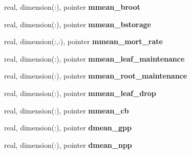 \begin{DoxyCompactItemize}
\item 
\hypertarget{structed__state__vars_1_1patchtype_a2a013a023ec71e2b554bc514fd9c9282}{
real, dimension(:), pointer {\bfseries mmean\_\-broot}}
\label{structed__state__vars_1_1patchtype_a2a013a023ec71e2b554bc514fd9c9282}

\item 
\hypertarget{structed__state__vars_1_1patchtype_a48dab77395ad823cafe89d0a52bda8e7}{
real, dimension(:), pointer {\bfseries mmean\_\-bstorage}}
\label{structed__state__vars_1_1patchtype_a48dab77395ad823cafe89d0a52bda8e7}

\item 
\hypertarget{structed__state__vars_1_1patchtype_a3a541c28f0a48ca5abe5ce2f834b38d2}{
real, dimension(:,:), pointer {\bfseries mmean\_\-mort\_\-rate}}
\label{structed__state__vars_1_1patchtype_a3a541c28f0a48ca5abe5ce2f834b38d2}

\item 
\hypertarget{structed__state__vars_1_1patchtype_aee9e218835a8e270ae3adbb804ff0c3a}{
real, dimension(:), pointer {\bfseries mmean\_\-leaf\_\-maintenance}}
\label{structed__state__vars_1_1patchtype_aee9e218835a8e270ae3adbb804ff0c3a}

\item 
\hypertarget{structed__state__vars_1_1patchtype_a7b9f536ab813fd34f2f90733b2f02f10}{
real, dimension(:), pointer {\bfseries mmean\_\-root\_\-maintenance}}
\label{structed__state__vars_1_1patchtype_a7b9f536ab813fd34f2f90733b2f02f10}

\item 
\hypertarget{structed__state__vars_1_1patchtype_aebd13813e9b9fe96817c90b298065ad0}{
real, dimension(:), pointer {\bfseries mmean\_\-leaf\_\-drop}}
\label{structed__state__vars_1_1patchtype_aebd13813e9b9fe96817c90b298065ad0}

\item 
\hypertarget{structed__state__vars_1_1patchtype_afe32b2161ec15c269a55fa110a7abf6f}{
real, dimension(:), pointer {\bfseries mmean\_\-cb}}
\label{structed__state__vars_1_1patchtype_afe32b2161ec15c269a55fa110a7abf6f}

\item 
\hypertarget{structed__state__vars_1_1patchtype_a46e98a1693cbdc4a6bd2c3f577ecaa23}{
real, dimension(:), pointer {\bfseries dmean\_\-gpp}}
\label{structed__state__vars_1_1patchtype_a46e98a1693cbdc4a6bd2c3f577ecaa23}

\item 
\hypertarget{structed__state__vars_1_1patchtype_ae1f7a0cd3fcad868986f67c2b73b7c66}{
real, dimension(:), pointer {\bfseries dmean\_\-npp}}
\label{structed__state__vars_1_1patchtype_ae1f7a0cd3fcad868986f67c2b73b7c66}


\end{DoxyCompactItemize}
